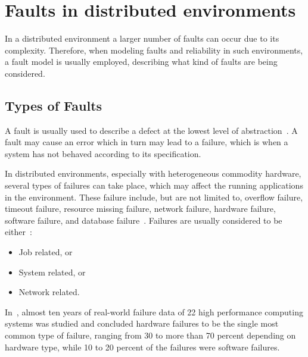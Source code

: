 \documentclass{cslthse-msc}
\begin{document}
\section{Faults in distributed environments} \label{sec:background_faults_distr_env}
In a distributed environment a larger number of faults can occur due to its complexity. Therefore, when modeling faults and reliability in such environments, a fault model is usually employed, describing what kind of faults are being considered.

\subsection{Types of Faults} \label{subsec:background_types_of_faults}
A fault is usually used to describe a defect at the lowest level of abstraction~\cite{faultTolerantFundamentals}. A fault may cause an error which in turn may lead to a failure, which is when a system has not behaved according to its specification.

In distributed environments, especially with heterogeneous commodity hardware, several types of failures can take place, which may affect the running applications in the environment. These failure include, but are not limited to, overflow failure, timeout failure, resource missing failure, network failure, hardware failure, software failure, and database failure~\cite{cloudServiceRel}. Failures are usually considered to be either~\cite{evalOfGridRel}:

\begin{itemize}
	\item Job related, or
	\item System related, or
	\item Network related.
\end{itemize}

In~\cite{studyOfFailures}, almost ten years of real-world failure data of 22 high performance computing systems was studied and concluded hardware failures to be the single most common type of failure, ranging from 30 to more than 70 percent depending on hardware type, while 10 to 20 percent of the failures were software failures.

\end{document}
